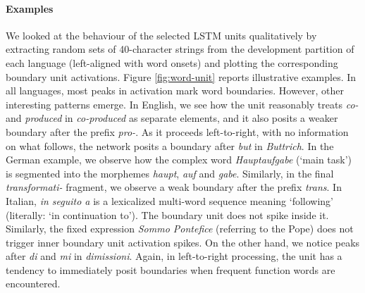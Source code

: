 \paragraph{Examples} We looked at the behaviour of the selected LSTM units qualitatively by
extracting random sets of 40-character strings from the development
partition of each language (left-aligned with word onsets) and
plotting the corresponding boundary unit activations. Figure
\ref{fig:word-unit} reports illustrative examples.  In all languages,
most peaks in activation mark word boundaries. However, other
interesting patterns emerge. In English, we see how the unit
reasonably treats \emph{co-} and \emph{produced} in \emph{co-produced}
as separate elements, and it also posits a weaker boundary after the
prefix \emph{pro-}. As it proceeds
left-to-right, with no information on what follows, the network posits a boundary after \emph{but} in \emph{Buttrich}. In
the German example, we observe how the complex word
\emph{Hauptaufgabe} (`main task') is segmented into the morphemes \emph{haupt},
\emph{auf} and \emph{gabe}. Similarly, in the final
\emph{transformati-} fragment, we observe a weak boundary after the prefix
\emph{trans}. In Italian, \emph{in seguito a} is a lexicalized
multi-word sequence meaning `following' (literally: `in
continuation to'). The boundary unit does not spike inside
it. Similarly, the fixed expression \emph{Sommo Pontefice} (referring
to the Pope) does not trigger inner boundary unit activation spikes.  On the
other hand, we notice peaks after \emph{di} and \emph{mi} in
\emph{dimissioni}. Again, in left-to-right processing, the unit has a
tendency to immediately posit boundaries when frequent function words
are encountered.


